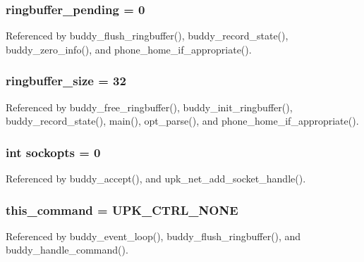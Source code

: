 \subsubsection[{ringbuffer\_\-pending}]{ {\bf ringbuffer\_\-pending} = 0\hspace{0.3cm}{\ttfamily  [static]}}\label{buddy_8c_af9029329735214e89a6493415ea518d8}


Referenced by buddy\_\-flush\_\-ringbuffer(), buddy\_\-record\_\-state(), buddy\_\-zero\_\-info(), and phone\_\-home\_\-if\_\-appropriate().

\subsubsection[{ringbuffer\_\-size}]{ {\bf ringbuffer\_\-size} = 32}\label{buddy_8c_aaf0b4e8526897974d594cc330ece0b5c}


Referenced by buddy\_\-free\_\-ringbuffer(), buddy\_\-init\_\-ringbuffer(), buddy\_\-record\_\-state(), main(), opt\_\-parse(), and phone\_\-home\_\-if\_\-appropriate().

\subsubsection[{sockopts}]{\setlength{\rightskip}{0pt plus 5cm}int {\bf sockopts} = 0\hspace{0.3cm}{\ttfamily  [static]}}\label{buddy_8c_a96887378de19e365e512e218277030e4}


Referenced by buddy\_\-accept(), and upk\_\-net\_\-add\_\-socket\_\-handle().

\subsubsection[{this\_\-command}]{ {\bf this\_\-command} = UPK\_\-CTRL\_\-NONE\hspace{0.3cm}{\ttfamily  [static]}}\label{buddy_8c_a398354ab30be5dc1e885373b075798c8}


Referenced by buddy\_\-event\_\-loop(), buddy\_\-flush\_\-ringbuffer(), and buddy\_\-handle\_\-command().


